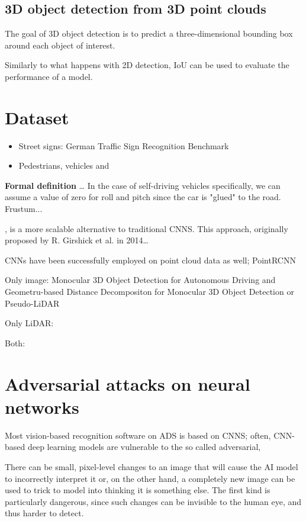 \subsection{3D object detection from 3D point clouds}
The goal of 3D object detection is to predict a three-dimensional bounding box around each object of interest.

Similarly to what happens with 2D detection, IoU can be used to evaluate the performance of a model.


\section*{Dataset}
\begin{itemize}
    \item Street signs: German Traffic Sign Recognition Benchmark
    \item Pedestrians, vehicles and 
\end{itemize}



\textbf{Formal definition}
\dots
In the case of self-driving vehicles specifically, we can assume a value of zero for roll and pitch since the car is "glued" to the road.
Frustum...





, is a more scalable alternative to traditional CNNS. This approach, originally proposed by R. Girshick et al.  in 2014\dots

CNNs have been successfully employed on point cloud data as well; PointRCNN





Only image: Monocular 3D Object Detection for Autonomous Driving and Geometru-based Distance Decompositon for Monocular 3D Object Detection or Pseudo-LiDAR

Only LiDAR: 

Both:





\newpage
\section{Adversarial attacks on neural networks}
Most vision-based recognition software on ADS is based on CNNS; often, CNN-based deep learning models are vulnerable to the so called adversarial, 

There can be small, pixel-level changes to an image that will cause the AI model to incorrectly interpret it or, on the other hand, a completely new image can be used to trick to model into thinking it is something else. The first kind is particularly dangerous, since such changes can be invisible to the human eye, and thus harder to detect.

